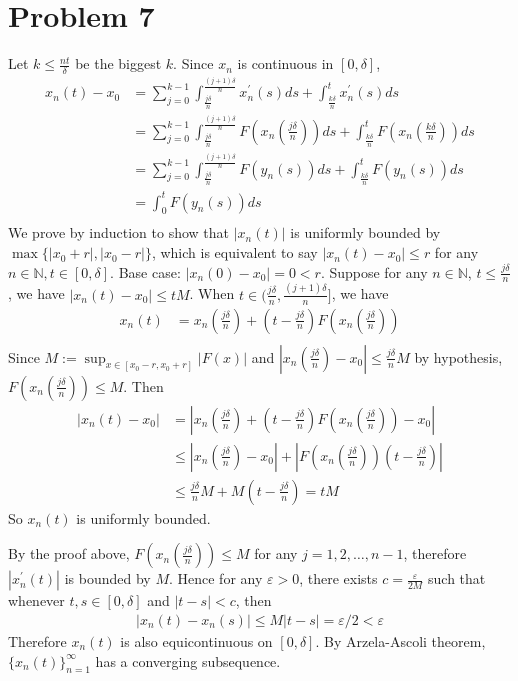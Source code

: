 \documentclass{report}
\def\ve{\varepsilon}
\def\abs#1{\left| #1 \right|}
\begin{document}
    \section*{Problem 7}
    Let $k \le \frac{nt}{\delta}$ be the biggest $k$. Since $x_n$ is continuous in $[0, \delta]$,
    \begin{align*}
        x_n(t) - x_0 &= \sum_{j=0}^{k-1} \int_{\frac{j\delta}{n}}^{\frac{(j+1)\delta}{n}}
            x_n^\prime(s)ds + \int_{\frac{k\delta}{n}}^{t} x_n^\prime(s)ds \\
        &= \sum_{j=0}^{k-1} \int_{\frac{j\delta}{n}}^{\frac{(j+1)\delta}{n}}
        F(x_n(\frac{j\delta}{n}))ds + \int_{\frac{k\delta}{n}}^{t} F(x_n(\frac{k\delta}{n}))ds \\
        &= \sum_{j=0}^{k-1} \int_{\frac{j\delta}{n}}^{\frac{(j+1)\delta}{n}}
        F(y_n(s))ds + \int_{\frac{k\delta}{n}}^{t} F(y_n(s))ds \\
        &= \int_{0}^{t} F(y_n(s))ds \\
    \end{align*}
    We prove by induction to show that $|x_n(t)|$ is uniformly bounded by 
    $\max\{|x_0+r|, |x_0-r|\}$, which is equivalent to say $\abs{x_n(t) - x_0} \le r$
    for any $n\in \mathbb{N}, t \in [0, \delta]$.
    Base case: $|x_n(0) - x_0| = 0 < r$.
    Suppose for any $n \in \mathbb{N}$, $t \le \frac{j\delta}{n}$, we have 
    $|x_n(t) - x_0| \le tM$. When $t \in (\frac{j\delta}{n}, \frac{(j+1)\delta}{n}]$,
    we have 
    \begin{align*}
        x_n(t) &= x_n(\frac{j\delta}{n}) + (t - \frac{j\delta}{n}) F(x_n(\frac{j\delta}{n})) \\
    \end{align*}
    Since $M := \sup_{x \in [x_0 - r, x_0 + r]} |F(x)|$ and  
    $\abs{x_n(\frac{j\delta}{n}) - x_0} \le \frac{j\delta}{n}M$
     by hypothesis, $F(x_n(\frac{j\delta}{n})) \le M$. Then 
    \begin{align*}
        |x_n(t)-x_0| &= \abs{x_n(\frac{j\delta}{n}) + 
                (t - \frac{j\delta}{n}) F(x_n(\frac{j\delta}{n})) - x_0} \\
            &\le
             \abs{x_n(\frac{j\delta}{n})-x_0} + \abs{F(x_n(\frac{j\delta}{n})) 
                (t - \frac{j\delta}{n})} \\
            &\le \frac{j\delta}{n}M + M(t - \frac{j\delta}{n}) = tM
    \end{align*}
    So $x_n(t)$ is uniformly bounded.
    
    By the proof above, $F(x_n(\frac{j\delta}{n})) \le M$ for any $j=1,2,\ldots,n-1$, 
    therefore $|x_n^\prime(t)|$ is bounded by $M$. Hence for any $\ve > 0$, there exists 
    $c = \frac{\ve}{2M}$ such that whenever $t, s \in [0, \delta]$ and $|t-s| < c$, then
    \begin{align*}
        \abs{x_n(t) - x_n(s)} \le M |t-s| = \ve / 2 < \ve
    \end{align*}
    Therefore $x_n(t)$ is also equicontinuous on $[0, \delta]$.
    By Arzela-Ascoli theorem, $\{x_n(t)\}_{n=1}^\infty$ has a converging subsequence.
\end{document}
